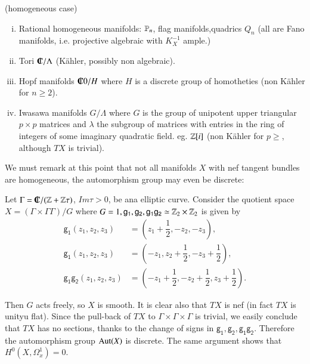 \begin{examples}(homogeneous case)\label{art5-example-3.2}
    \begin{enumerate}[(i)]
    \item Rational homogeneous manifolds: $\mathbb{P}_{n}$, flag manifolds,quadrics $Q_{n}$ (all are Fano manifolds, i.e.      projective algebraic with $K_{X}^{-1}$ ample.)\label{art5-enu-{i}}
     \item Tori $\IC/\Lambda$
     (K\"ahler, possibly non algebraic). \label{art5-enu-{ii}}   
    \item Hopf manifolds $\IC{0}/H$ where $H$ is a discrete group of homotheties (non K\"ahler for $n\geq 2$).\label{art5-enu-{iii}}
    \item Iwasawa manifolds $G/\Lambda$ where $G$ is the group of unipotent upper triangular $p\times p$ matrices and $\lambda$ the subgroup of matrices with entries in the ring of integers of some imaginary quadratic field. eg. $\mathbb{Z}[i]$ (non K\"ahler for $p\geq$, although $TX$ is trivial).\label{art5-enu-{iv}}
    \end{enumerate}
\end{examples}

We must remark at this point that not all manifolds $X$ with nef tangent bundles are homogeneous, the automorphism group may even be discrete:

\begin{example}\label{art5-example-3.3}
Let $\Gamma = \IC/(\bbZ + \bbZ \tau)$, $Im\tau > 0$, be ana elliptic curve. Consider the quotient space $X = (\Gamma \times \Gamma \Gamma)/G $ where $G={1, \mathsf{g_{1}}, \mathsf{g_{2}}, \mathsf{g_{1}}\mathsf{g_{2}}} \simeq \mathbb{Z}_{2} \times \mathbb{Z}_{2}$ is given by
\begin{align*}
\mathsf{g_{1}}(z_{1}, z_{2}, z_{3}) &= \left(z_{1} + \dfrac{1}{2}, -z_{2}, -z_{3}\right),\\
\mathsf{g_{1}}(z_{1}, z_{2}, z_{3}) &= \left(-z_{1}, z_{2}+ \dfrac{1}{2}, -z_{3}+ \dfrac{1}{2}\right),\\
\mathsf{g_{1}g_{2}}(z_{1}, z_{2}, z_{3})& =\left(-z_{1}+\dfrac{1}{2}, -z_{2}+\dfrac{1}{2}, z_{3}+ \dfrac{1}{2}\right).
\end{align*}

Then $G$ acts freely, so $X$ is smooth. It is clear also that $TX$ is nef (in fact $TX$ is unityu flat). Since the pull-back of $TX$ to $\Gamma \times \Gamma \times \Gamma$ is trivial, we easily conclude that $TX$ has no sections, thanks to the change of signs in $ \mathsf{g_{1}}, \mathsf{g_{2}}, \mathsf{g_{1}g_{2}}$. Therefore the automorphism group $\operatorname{Aut}(X)$ is discrete. The same argument shows that $H^{0}(X, \Omega_{x}^{1}) = 0$.
\end{example}

